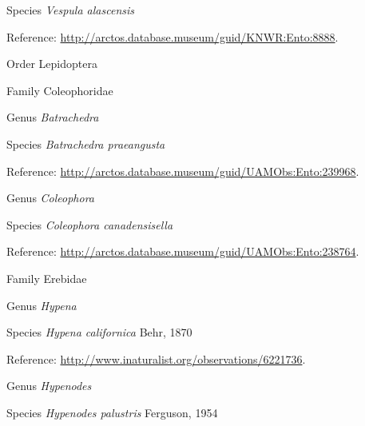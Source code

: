 \documentclass[9pt, article]{memoir}
\begin{document}
\begin{multicols}{2}
\vspace{6pt}\noindent\hspace{36pt}Species \textit{Vespula alascensis}


Reference: 
\url{http://arctos.database.museum/guid/KNWR:Ento:8888}.

\vspace{6pt}\noindent\hspace{18pt}Order Lepidoptera


\vspace{6pt}\noindent\hspace{24pt}Family Coleophoridae


\vspace{6pt}\noindent\hspace{30pt}Genus \textit{Batrachedra}


\vspace{6pt}\noindent\hspace{36pt}Species \textit{Batrachedra praeangusta}


Reference: 
\url{http://arctos.database.museum/guid/UAMObs:Ento:239968}.

\vspace{6pt}\noindent\hspace{30pt}Genus \textit{Coleophora}


\vspace{6pt}\noindent\hspace{36pt}Species \textit{Coleophora canadensisella}


Reference: 
\url{http://arctos.database.museum/guid/UAMObs:Ento:238764}.

\vspace{6pt}\noindent\hspace{24pt}Family Erebidae


\vspace{6pt}\noindent\hspace{30pt}Genus \textit{Hypena}


\vspace{6pt}\noindent\hspace{36pt}Species \textit{Hypena californica} Behr, 1870


Reference: 
\url{http://www.inaturalist.org/observations/6221736}.

\vspace{6pt}\noindent\hspace{30pt}Genus \textit{Hypenodes}


\vspace{6pt}\noindent\hspace{36pt}Species \textit{Hypenodes palustris} Ferguson, 1954



\end{multicols}
\end{document}
